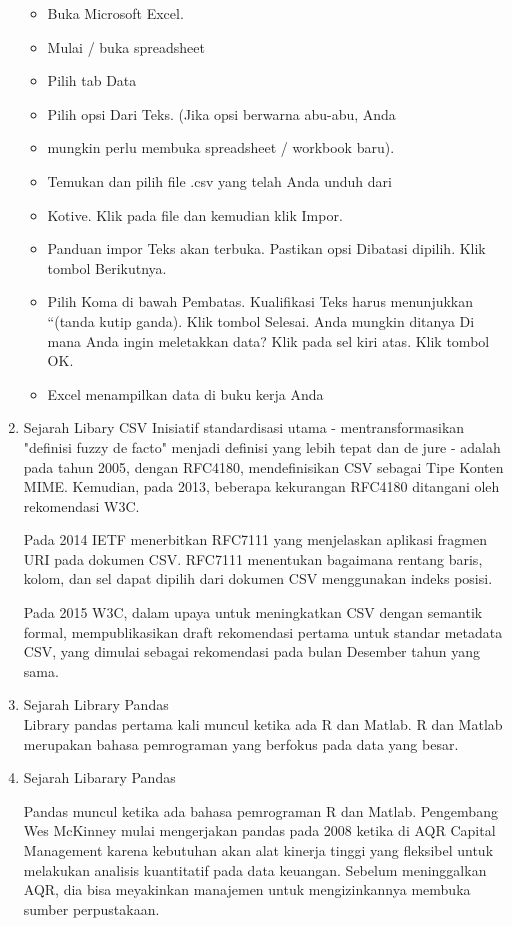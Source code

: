 \begin{enumerate}
\begin{itemize}
\item Buka Microsoft Excel.
\item Mulai / buka spreadsheet 
\item Pilih tab Data 
\item Pilih opsi Dari Teks. (Jika opsi berwarna abu-abu, Anda \item mungkin perlu membuka spreadsheet / workbook baru).
\item Temukan dan pilih file .csv yang telah Anda unduh dari \item Kotive. Klik pada file dan kemudian klik Impor.
\item Panduan impor Teks akan terbuka. Pastikan opsi Dibatasi  dipilih. Klik tombol Berikutnya.
\item Pilih Koma di bawah Pembatas. Kualifikasi Teks harus menunjukkan “(tanda kutip ganda). Klik tombol Selesai.
Anda mungkin ditanya Di mana Anda ingin meletakkan data? Klik pada sel kiri atas. Klik tombol OK.
\item Excel menampilkan data di buku kerja Anda
\end{itemize}



\item Sejarah Libary CSV
Inisiatif standardisasi utama - mentransformasikan "definisi fuzzy de facto" menjadi definisi yang lebih tepat dan de jure - adalah pada tahun 2005, dengan RFC4180, mendefinisikan CSV sebagai Tipe Konten MIME. Kemudian, pada 2013, beberapa kekurangan RFC4180 ditangani oleh rekomendasi W3C.

Pada 2014 IETF menerbitkan RFC7111 yang menjelaskan aplikasi fragmen URI pada dokumen CSV. RFC7111 menentukan bagaimana rentang baris, kolom, dan sel dapat dipilih dari dokumen CSV menggunakan indeks posisi.

Pada 2015 W3C, dalam upaya untuk meningkatkan CSV dengan semantik formal, mempublikasikan draft rekomendasi pertama untuk standar metadata CSV, yang dimulai sebagai rekomendasi pada bulan Desember tahun yang sama.
\item Sejarah Library Pandas\\
Library pandas pertama kali muncul ketika ada R dan Matlab. R dan Matlab merupakan bahasa pemrograman yang berfokus pada data yang besar. 

\item Sejarah Libarary Pandas

Pandas muncul ketika ada bahasa pemrograman R dan Matlab.
Pengembang Wes McKinney mulai mengerjakan pandas pada 2008 ketika di AQR Capital Management karena kebutuhan akan alat kinerja tinggi yang fleksibel untuk melakukan analisis kuantitatif pada data keuangan. Sebelum meninggalkan AQR, dia bisa meyakinkan manajemen untuk mengizinkannya membuka sumber perpustakaan.


\end{enumerate}
